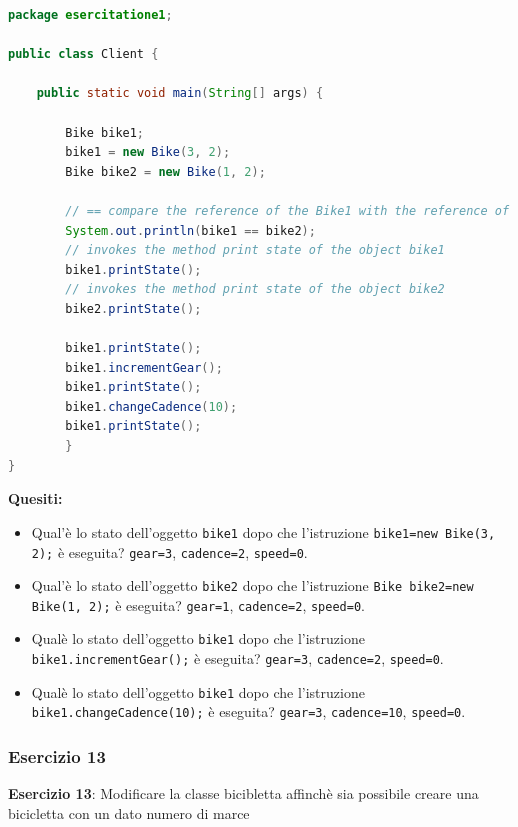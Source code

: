 \documentclass{article}
\theoremstyle{definition}
\begin{document}
\begin{lstlisting}[language=Java,escapechar=|]
package esercitatione1;

public class Client {

	public static void main(String[] args) {

		Bike bike1;
		bike1 = new Bike(3, 2);
		Bike bike2 = new Bike(1, 2);

		// == compare the reference of the Bike1 with the reference of the Bike2
		System.out.println(bike1 == bike2);
		// invokes the method print state of the object bike1
		bike1.printState();
		// invokes the method print state of the object bike2
		bike2.printState();

		bike1.printState();
		bike1.incrementGear();
		bike1.printState();
		bike1.changeCadence(10);
		bike1.printState();
	    }
}
\end{lstlisting}
\textbf{Quesiti:}\\
\begin{itemize}
\item Qual'\`e lo stato dell'oggetto \texttt{bike1} dopo che l'istruzione   \texttt{bike1=new Bike(3, 2);} \`e eseguita? 
\texttt{gear=3}, \texttt{cadence=2}, \texttt{speed=0}.
\item Qual'\`e lo stato dell'oggetto  \texttt{bike2} dopo che l'istruzione  \texttt{Bike bike2=new Bike(1, 2);} \`e eseguita? 
\texttt{gear=1}, \texttt{cadence=2}, \texttt{speed=0}.
\item Qual\`e lo stato dell'oggetto \texttt{bike1} dopo che l'istruzione \texttt{bike1.incrementGear();} \`e eseguita? 
\texttt{gear=3}, \texttt{cadence=2}, \texttt{speed=0}.
\item Qual\`e lo stato dell'oggetto \texttt{bike1} dopo che l'istruzione   \texttt{bike1.changeCadence(10);} \`e eseguita? 
\texttt{gear=3}, \texttt{cadence=10}, \texttt{speed=0}.
\end{itemize}

\subsubsection{Esercizio 13}
\begin{framed}
\textbf{Esercizio 13}: Modificare la classe bicibletta affinch\`e sia possibile creare una bicicletta con un dato numero di marce 
\end{framed}
\end{document}

